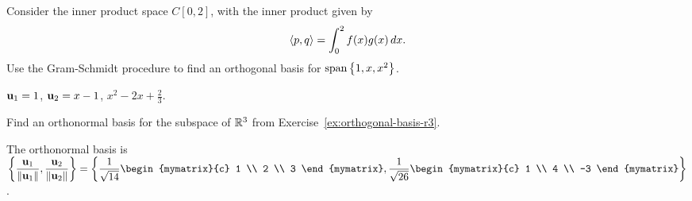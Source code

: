 \begin{ex}
  Consider the inner product space $C[0,2]$, with the inner product
  given by
  \begin{equation*}
    \langle p,q\rangle = \int_{0}^{2} f(x)g(x)\,dx.
  \end{equation*}
  Use the Gram-Schmidt procedure to find an orthogonal basis for
  $\sspan\set{1,x,x^2}$.
  \begin{sol}
    $\vect{u}_1 = 1$, $\vect{u}_2 = x-1$, $x^2 - 2x + \frac{2}{3}$.
  \end{sol}
\end{ex}

\begin{ex}
  Find an orthonormal basis for the subspace of $\mathbb{R}^3$ from Exercise~\ref{ex:orthogonal-basis-r3}.
  \begin{sol}
    The orthonormal basis is $\displaystyle\set{
      \frac{\vect{u}_1}{\norm{\vect{u}_1}},
      \frac{\vect{u}_2}{\norm{\vect{u}_2}}
    } = \set{
      \frac{1}{\sqrt{14}} \begin{mymatrix}{c} 1 \\ 2 \\ 3 \end{mymatrix},
      \frac{1}{\sqrt{26}} \begin{mymatrix}{c} 1 \\ 4 \\
        -3 \end{mymatrix}
    }$.
  \end{sol}
\end{ex}
